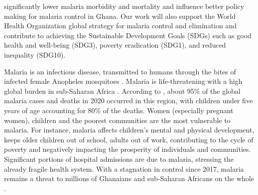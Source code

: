 \documentclass[utf8]{FrontiersinHarvard} %
\begin{document}
significantly lower malaria morbidity and mortality and influence better policy making for malaria control in Ghana. Our work will also support the World Health Organization global strategy for malaria control and elimination and contribute to achieving the Sustainable Development Goals (SDGs) such as good health and well-being (SDG3), poverty eradication (SDG1), and reduced inequality (SDG10). 

\noindent Malaria is an infectious disease, transmitted to humans through the bites of infected female Anopheles mosquitoes \citep{world2022world}. Malaria is life-threatening with a high global burden in sub-Saharan Africa \citep{world2022world}. According to \cite{world2022world}, about 95\% of the global malaria cases and deaths in 2020 occurred in this region, with children under five years of age accounting for 80\% of the deaths. Women (especially pregnant women), children and the poorest communities are the most vulnerable to malaria. For instance, malaria affects children's mental and physical development, keeps older children out of school, adults out of work, contributing to the cycle of poverty and negatively impacting the prosperity of individuals and communities. Significant portions of hospital admissions are due to malaria, stressing the already fragile health system. With a stagnation in control since 2017, malaria remains a threat to millions of Ghanaians and sub-Saharan Africans on the whole \citep{world2022world}.
\end{document}
